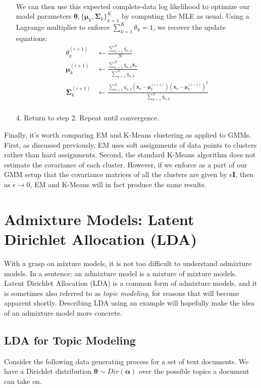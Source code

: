 \begin{itemize}
\begin{align*}
        \end{align*}
        We can then use this expected complete-data log likelihood to optimize our model parameters $\boldsymbol{\theta}, \{ \boldsymbol{\mu}_k, \boldsymbol{\Sigma}_k \}_{k=1}^{K}$ by computing the MLE as usual. Using a Lagrange multiplier to enforce $\sum_{k=1}^{K} \theta_k = 1$, we recover the update equations:
        \begin{align*}
            \theta_k^{(i + 1)} &\leftarrow \frac{\sum_{n=1}^{N} q_{n, k}}{N} \\
            \boldsymbol{\mu}_k^{(i + 1)} &\leftarrow \frac{\sum_{n=1}^{N} q_{n, k} \textbf{x}_n}{\sum_{n=1}^{N} q_{n, k}} \\
            \boldsymbol{\Sigma}_k^{(i + 1)} &\leftarrow \frac{\sum_{n=1}^{N} q_{n, k} (\textbf{x}_n - \boldsymbol{\mu}_k^{(i + 1)})(\textbf{x}_n - \boldsymbol{\mu}_k^{(i + 1)})^{T}}{\sum_{n=1}^{N} q_{n, k}} \\
        \end{align*}
    \item[4.] Return to step 2. Repeat until convergence.
\end{itemize}

Finally, it's worth comparing EM and K-Means clustering as applied to GMMs. First, as discussed previously, EM uses soft assignments of data points to clusters rather than hard assignments. Second, the standard K-Means algorithm does not estimate the covariance of each cluster. However, if we enforce as a part of our GMM setup that the covariance matrices of all the clusters are given by $\epsilon \textbf{I}$, then as $\epsilon \rightarrow 0$, EM and K-Means will in fact produce the same results.

\section{Admixture Models: Latent Dirichlet Allocation (LDA)}
With a grasp on mixture models, it is not too difficult to understand admixture models. In a sentence: an admixture model is a mixture of mixture models. Latent Dirichlet Allocation (LDA) is a common form of admixture models, and it is sometimes also referred to as \textit{topic modeling}, for reasons that will become apparent shortly. Describing LDA using an example will hopefully make the idea of an admixture model more concrete.

\subsection{LDA for Topic Modeling}
Consider the following data generating process for a set of text documents. We have a Dirichlet distribution $\boldsymbol{\theta} \sim Dir(\boldsymbol{\alpha})$ over the possible topics a document can take on.

